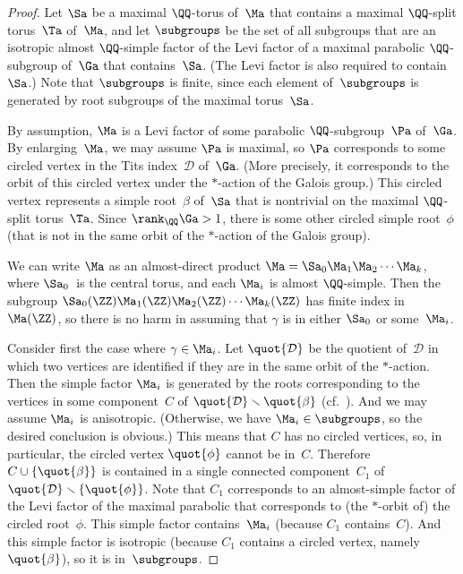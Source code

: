 \begin{proof}
Let $\Sa$ be a maximal $\QQ$-torus of~$\Ma$ that contains a maximal $\QQ$-split torus~$\Ta$ of~$\Ma$, and let $\subgroups$ be the set of all subgroups that are an isotropic almost $\QQ$-simple factor of the Levi factor of a maximal parabolic $\QQ$-subgroup of~$\Ga$ that contains~$\Sa$. (The Levi factor is also required to contain~$\Sa$.) Note that $\subgroups$ is finite, since each element of~$\subgroups$ is generated by root subgroups of the maximal torus~$\Sa$.

By assumption, $\Ma$ is a Levi factor of some parabolic $\QQ$-subgroup~$\Pa$ of~$\Ga$. By enlarging~$\Ma$, we may assume $\Pa$ is maximal, so $\Pa$ corresponds to some circled vertex in the Tits index~$\mathcal{D}$ of~$\Ga$. (More precisely, it corresponds to the orbit of this circled vertex under the $*$-action of the Galois group.)
This circled vertex represents a simple root~$\beta$ of~$\Sa$ that is nontrivial on the maximal $\QQ$-split torus~$\Ta$. Since $\rank_\QQ \Ga > 1$, there is some other circled simple root~$\phi$ (that is not in the same orbit of the $*$-action of the Galois group).

We can write $\Ma$ as an almost-direct product $\Ma = \Sa_0 \Ma_1 \Ma_2 \cdots \Ma_k$, where $\Sa_0$~is the central torus, and each $\Ma_i$ is almost $\QQ$-simple.
Then the subgroup $\Sa_0(\ZZ) \Ma_1(\ZZ) \Ma_2(\ZZ) \cdots \Ma_k(\ZZ)$ has finite index in $\Ma(\ZZ)$, so there is no harm in assuming that $\gamma$ is in either $\Sa_0$ or some~$\Ma_i$.

Consider first the case where $\gamma \in \Ma_i$.
Let $\quot{\mathcal{D}}$ be the quotient of~$\mathcal{D}$ in which two vertices are identified if they are in the same orbit of the $*$-action. Then the simple factor $\Ma_i$ is generated by the roots corresponding to the vertices in some component~$C$ of $\quot{\mathcal{D}} \smallsetminus \quot{\beta}$ (cf.\ \cite[????~2.5.4, p.~41]{Tits-Classif}).
And we may assume $\Ma_i$ is anisotropic. (Otherwise, we have $\Ma_i \in \subgroups$, so the desired conclusion is obvious.) This means that $C$ has no circled vertices, so, in particular, the circled vertex $\quot{\phi}$ cannot be in~$C$. Therefore $C \cup \{\quot{\beta}\}$ is contained in a single connected component~$C_1$ of $\quot{\mathcal{D}} \smallsetminus \{\quot{\phi}\}$. Note that $C_1$ corresponds to an almost-simple factor of the Levi factor of the maximal parabolic that corresponds to (the $*$-orbit of) the circled root~$\phi$. This simple factor contains~$\Ma_i$ (because $C_1$ contains~$C$). And this simple factor is isotropic (because $C_1$ contains a circled vertex, namely~$\quot{\beta}$), so it is in~$\subgroups$.


\end{proof}
